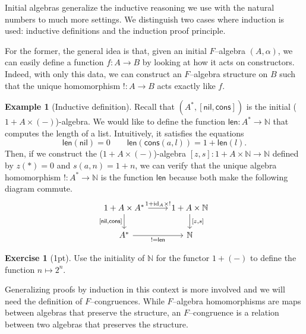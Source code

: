 \documentclass{article}
\theoremstyle{definition}
\newtheorem{exmp}[thm]{Example}
\newtheorem{exer}{Exercise}
\theoremstyle{remark}
\newcommand{\N}{\mathbb{N}}
\begin{document}
Initial algebras generalize the inductive reasoning we use with the natural numbers to much more settings. We distinguish two cases where induction is used: inductive definitions and the induction proof principle. 

For the former, the general idea is that, given an initial $F$--algebra $(A,\alpha)$, we can easily define a function $f:A\rightarrow B$ by looking at how it acts on constructors. Indeed, with only this data, we can construct an $F$--algebra structure on $B$ such that the unique homomorphism $!:A\rightarrow B$ acts exactly like $f$.
\begin{exmp}[Inductive definition]
	Recall that $(A^*, [\textsf{nil}, \textsf{cons}])$ is the initial ($1+A\times(-)$)-algebra. We would like to define the function $\textsf{len}:A^* \rightarrow \N$ that computes the length of a list. Intuitively, it satisfies the equations \[\textsf{len}(\textsf{nil}) = 0 \quad \quad \textsf{len}(\textsf{cons}(a,l)) = 1+\textsf{len}(l).\]
	Then, if we construct the ($1+A\times(-)$)-algebra $[z, s]:1+ A\times \N \rightarrow \N$ defined by $z(\ast) = 0$ and $s(a,n) = 1+n$, we can verify that the unique algebra homomorphism $!:A^*\rightarrow \N$ is the function $\textsf{len}$ because both make the following diagram commute.
	\begin{equation}\label{diag-lendef}
	\centering
		\begin{tikzcd}
			1+A\times A^* \arrow[d, "{[\textsf{nil}, \textsf{cons}]}"'] \arrow[r, "1+\text{id}_A\times !"] & 1+A\times \N \arrow[d, "{[z,s]}"] \\
			A^* \arrow[r, "!=\textsf{len}"']                                                                            & \N                               
		\end{tikzcd}
	\end{equation}
\end{exmp}
\begin{exer}[1pt]
    Use the initiality of $\N$ for the functor $1+(-)$ to define the function $n \mapsto 2^n$.
\end{exer}
Generalizing proofs by induction in this context is more involved and we will need the definition of $F$--congruences. While $F$--algebra homomorphisms are maps between algebras that preserve the structure, an $F$--congruence is a relation between two algebras that preserves the structure.
\end{document}
